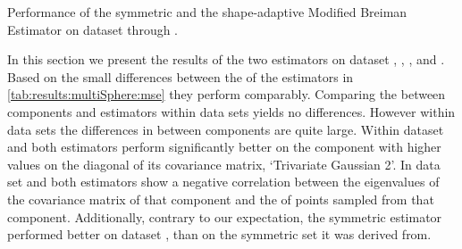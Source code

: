 \begin{table}
	\centering
	
	\caption{Performance of the symmetric and the shape-adaptive Modified Breiman Estimator on dataset \ferdosiTwo through \baakmanThree.} 	
	\label{tab:results:multiSphere:mse}
\end{table}

In this section we present the results of the two estimators on dataset \ferdosiTwo, \baakmanTwo, \ferdosiThree, and \baakmanThree.
	Based on the small differences between the \mses of the estimators in \cref{tab:results:multiSphere:mse} they perform comparably. 
	Comparing the \MSE between components and estimators within data sets yields no differences. However within data sets the differences in \mses between components are quite large.
	Within dataset \ferdosiTwo and \baakmanTwo both estimators perform significantly better on the component with higher values on the diagonal of its covariance matrix, \eg `Trivariate Gaussian 2'.
	In data set \ferdosiThree and \baakmanThree both estimators show a negative correlation between the eigenvalues of the covariance matrix of that component and the \MSE of points sampled from that component. Additionally, contrary to our expectation, the symmetric estimator performed better on dataset \baakmanThree, than on the symmetric set it was derived from.

